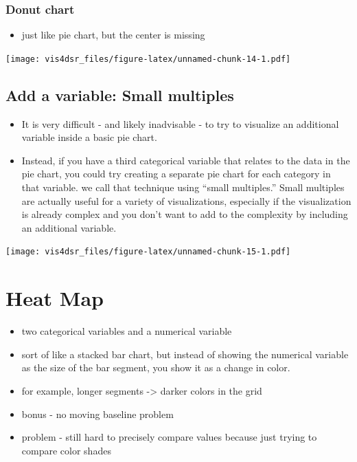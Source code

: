 \documentclass[
]{krantz}
\providecommand{\tightlist}{%
  \setlength{\itemsep}{0pt}\setlength{\parskip}{0pt}}
\begin{document}
\hypertarget{donut-chart}{%
\subsubsection{Donut chart}\label{donut-chart}}

\begin{itemize}
\tightlist
\item
  just like pie chart, but the center is missing
\end{itemize}

\texttt{[image: vis4dsr\_files/figure-latex/unnamed-chunk-14-1.pdf]}

\hypertarget{add-a-variable-small-multiples}{%
\subsection{Add a variable: Small multiples}\label{add-a-variable-small-multiples}}

\begin{itemize}
\tightlist
\item
  It is very difficult - and likely inadvisable - to try to visualize an additional
  variable inside a basic pie chart.
\item
  Instead, if you have a third categorical variable that relates to the data in
  the pie chart, you could try creating a separate pie chart for each category in
  that variable. we call that technique using ``small multiples.'' Small multiples
  are actually useful for a variety of visualizations, especially if the visualization
  is already complex and you don't want to add to the complexity by including an
  additional variable.
\end{itemize}

\texttt{[image: vis4dsr\_files/figure-latex/unnamed-chunk-15-1.pdf]}

\hypertarget{heat-map}{%
\section{Heat Map}\label{heat-map}}

\begin{itemize}
\tightlist
\item
  two categorical variables and a numerical variable
\item
  sort of like a stacked bar chart, but instead of showing the numerical
  variable as the size of the bar segment, you show it as a change in color.
\item
  for example, longer segments -\textgreater{} darker colors in the grid
\item
  bonus - no moving baseline problem
\item
  problem - still hard to precisely compare values because just trying to compare
  color shades
\end{itemize}
\end{document}
